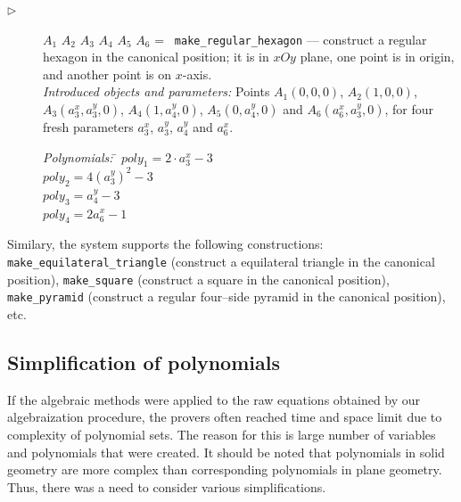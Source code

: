 \documentclass[final,1p,times,authoryear]{elsarticle}
\begin{document}
\begin{description}
\item[$\triangleright$] $A_1$ $A_2$ $A_3$ $A_4$ $A_5$ $A_6$ = {\tt
    make\_regular\_hexagon} --- construct a regular hexagon in the
  canonical position; it is in $xOy$ plane, one point is in origin,
  and another
  point is on $x$-axis. \\
  {\em Introduced objects and parameters:} Points $A_1(0, 0, 0)$,
  $A_2(1, 0, 0)$, $A_3(a_3^x, a_3^y, 0)$, $A_4(1, a_4^y, 0)$,
  $A_5(0, a_4^y, 0)$ and $A_6(a_6^x, a_3^y, 0)$, for four fresh
  parameters $a_3^x$, $a_3^y$, $a_4^y$ and $a_6^x$.

\begin{tabbing}
{\em Polynomials:} \= $poly_1 = 2\cdot a_3^x - 3$ \\
                   \> $poly_2 = 4(a_3^y)^2 - 3$ \\
                   \> $poly_3 = a_4^y - 3$ \\
                   \> $poly_4 = 2a_6^x - 1$
\end{tabbing}
\end{description}


Similary, the system supports the following constructions: {\tt
  make\_equilateral\_triangle} (construct a equilateral triangle in
the canonical position), {\tt make\_square} (construct a square in the
canonical position), {\tt make\_pyramid} (construct a regular
four--side pyramid in the canonical position), etc.


\subsection{Simplification of polynomials}
\label{simplification}

If the algebraic methods were applied to the raw equations obtained by
our algebraization procedure, the provers often reached time and space
limit due to complexity of polynomial sets. The reason for this is
large number of variables and polynomials that were created. It should
be noted that polynomials in solid geometry are more complex than
corresponding polynomials in plane geometry. Thus, there was a need to
consider various simplifications.
\end{document}
